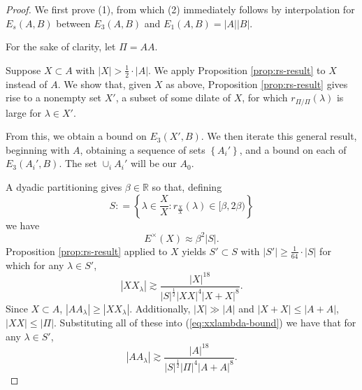 \documentclass[10pt,a4paper]{amsart}
\begin{document}
\begin{proof}
We first prove (1), from which (2) immediately follows by interpolation for \(E_{s} (A,B)\)
between \(E_3(A,B)\) and \(E_{1} (A,B) = \left\lvert A \right\rvert \left\lvert B \right\rvert \).

For the sake of clarity, let \(\Pi = AA\).

Suppose \(X \subset A\) with \(\left\lvert X \right\rvert  > \frac{1}{2} \cdot \left\lvert A \right\rvert \).
We apply Proposition \ref{prop:rs-result} to \(X\) instead of \(A\).
We show that, given \(X\) as above, Proposition \ref{prop:rs-result} gives rise to a
nonempty set \(X'\), a subset of some dilate of \(X\), for which
\(r_{\Pi / \Pi} (\lambda)\) is large for \(\lambda \in X'\). 

From this, we obtain
a bound on \(E_3(X',B)\). We then iterate this
general result, beginning with \(A\), obtaining a sequence of sets \(\left\{ A_{i} ' \right\} \),
and a bound on each of \(E_3(A_{i} ',B)\). The set \(\cup _{i} A_{i}' \) will be our \(A_0\).

A dyadic partitioning gives \(\beta \in \mathbb{R} \) so that, defining
\[
    S  : = \left\{ \lambda \in \frac{X}{X} : r_{\frac{X}{X} } (\lambda) \in [\beta,2\beta) \right\} 
\]
we have
\[
    E^{\times }(X) \approx \beta ^{2}\left\lvert S  \right\rvert 
.\]
Proposition \ref{prop:rs-result} applied to \(X\) yields \(S ' \subset S \) with \(\left\lvert S ' \right\rvert \geq \frac{1}{64} \cdot \left\lvert S  \right\rvert \) for which
for any \(\lambda \in S'\),
\begin{equation} \label{eq:xxlambda-bound}
    \left\lvert X X_{\lambda}  \right\rvert \gtrsim \frac{\left\lvert X \right\rvert ^{18}}{\left\lvert S \right\rvert ^{\frac{1}{2} } \left\lvert XX \right\rvert ^{4} \left\lvert X + X \right\rvert ^{8}}.
\end{equation}  
Since \(X \subset A\), \(\left\lvert A A_{\lambda}  \right\rvert \geq \left\lvert X X_{\lambda}  \right\rvert \). Additionally, \(\left\lvert X \right\rvert \gg \left\lvert A \right\rvert \)
and \(\left\lvert X + X \right\rvert \leq \left\lvert A+A \right\rvert \), \(\left\lvert XX \right\rvert \leq \left\lvert \Pi \right\rvert \).
Substituting all of these into (\ref{eq:xxlambda-bound}) we have that for any \(\lambda \in S'\),
\[
    \left\lvert A A_{\lambda}  \right\rvert \gtrsim  \frac{\left\lvert A \right\rvert ^{18}}{\left\lvert S \right\rvert ^{\frac{1}{2} } \left\lvert \Pi \right\rvert ^{4} \left\lvert A + A \right\rvert ^{8}} 
.\]


\end{proof}
\end{document}
